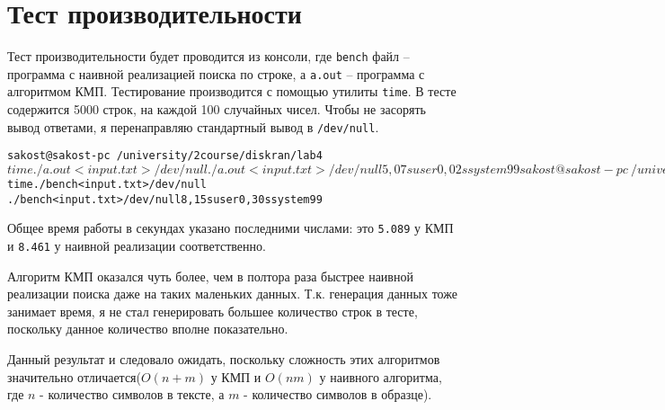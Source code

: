 \section{Тест производительности}


Тест производительности будет проводится из консоли, где \texttt{bench} файл -- программа с наивной реализацией поиска по строке,
а \texttt{a.out}  -- программа с алгоритмом КМП. Тестирование производится с помощью утилиты \texttt{time}.
В тесте содержится 5000 строк, на каждой 100 случайных чисел.
Чтобы не засорять вывод ответами, я перенаправляю стандартный вывод в \texttt{/dev/null}.

\begin{alltt}
    sakost@sakost-pc ~/university/2 course/diskran/lab4$ time ./a.out < input.txt > /dev/null
./a.out < input.txt > /dev/null  5,07s user 0,02s system 99% cpu 5,089 total
sakost@sakost-pc ~/university/2 course/diskran/lab4$ time ./bench < input.txt > /dev/null
./bench < input.txt > /dev/null  8,15s user 0,30s system 99% cpu 8,461 total
\end{alltt}

Общее время работы в секундах указано последними числами: это \texttt{5.089} у КМП и \texttt{8.461} у наивной реализации соответственно.

Алгоритм КМП оказался чуть более, чем в полтора раза быстрее наивной реализации поиска даже на таких маленьких данных.
Т.к. генерация данных тоже занимает время, я не стал генерировать большее количество строк в тесте, поскольку данное количество вполне показательно.

Данный результат и следовало ожидать, поскольку сложность этих алгоритмов значительно отличается($O(n+m)$ у КМП и $O(nm)$ у наивного алгоритма, где $n$ - количество символов в тексте, а $m$ - количество символов в образце).
\pagebreak

